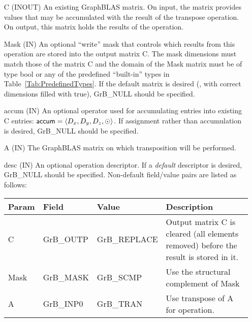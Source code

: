 \begin{itemize}[leftmargin=1.1in]
    \item[{\sf C}]    ({\sf INOUT}) An existing GraphBLAS matrix.  On input,
    the matrix provides values that may be accumulated with the result of the
    transpose operation.  On output, this matrix holds the results of the
    operation.

    \item[{\sf Mask}] ({\sf IN}) An optional ``write'' mask that controls which
    results from this operation are stored into the output matrix {\sf C}. The 
    mask dimensions must match those of the matrix {\sf C} and the domain of the 
    {\sf Mask} matrix must be of type {\sf bool} or any of the predefined 
    ``built-in'' types in Table~\ref{Tab:PredefinedTypes}.  If the default
    matrix is desired (\ie, with correct dimensions filled with {\sf true}), 
    {\sf GrB\_NULL} should be specified.

    \item[{\sf accum}]    ({\sf IN}) An optional operator used for accumulating
    entries into existing {\sf C} entries: ${\sf accum} = \langle D_x,
    D_y, D_z,\odot \rangle$. If assignment rather than accumulation is
    desired, {\sf GrB\_NULL} should be specified.

    \item[{\sf A}]     ({\sf IN}) The GraphBLAS matrix on which
	    transposition will be performed.

    \item[{\sf desc}] ({\sf IN}) An optional operation descriptor. If
    a \emph{default} descriptor is desired, {\sf GrB\_NULL} should be
    specified. Non-default field/value pairs are listed as follows:  \\

    \begin{tabular}{lllp{2.5in}}
        Param & Field  & Value & Description \\ \hline
        {\sf C}    & {\sf GrB\_OUTP} & {\sf GrB\_REPLACE} & Output matrix {\sf C}
        is cleared (all elements removed) before the result is stored in it. \\
        
	    {\sf Mask} & {\sf GrB\_MASK} & {\sf GrB\_SCMP}   & Use the structural complement of {\sf Mask}\\

        {\sf A}    & {\sf GrB\_INP0} & {\sf GrB\_TRAN}   & Use transpose of {\sf A} for operation. 
    \end{tabular}
\end{itemize}

